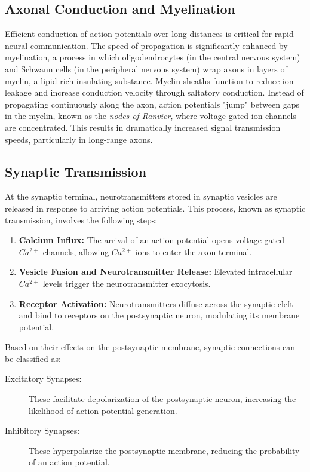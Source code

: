 \subsection{Axonal Conduction and Myelination}
\label{subsec:axonal_conduction}
Efficient conduction of action potentials over long distances is critical for
rapid neural communication. The speed of propagation is significantly enhanced by
myelination, a process in which oligodendrocytes (in the central nervous system) 
and Schwann cells (in the peripheral nervous system) wrap axons in layers of myelin, 
a lipid-rich insulating substance. Myelin sheaths function to reduce ion leakage and 
increase conduction velocity through saltatory conduction. Instead of propagating 
continuously along the axon, action potentials "jump" between gaps in the myelin, 
known as the \emph{nodes of Ranvier}, where voltage-gated ion channels are concentrated. 
This results in dramatically increased signal transmission speeds, particularly 
in long-range axons.

\subsection{Synaptic Transmission}
\label{subsec:synaptic_transmission}
At the synaptic terminal, neurotransmitters stored in synaptic vesicles are released 
in response to arriving action potentials. This process, known as synaptic transmission,
involves the following steps:

\begin{enumerate}
    \item \textbf{Calcium Influx:} The arrival of an action potential opens voltage-gated 
    $Ca^{2+}$ channels, allowing $Ca^{2+}$ ions to enter the axon terminal.
    \item \textbf{Vesicle Fusion and Neurotransmitter Release:} Elevated intracellular $Ca^{2+}$
    levels trigger the neurotransmitter exocytosis.
    \item \textbf{Receptor Activation:} Neurotransmitters diffuse across the synaptic cleft 
    and bind to receptors on the postsynaptic neuron, modulating its membrane potential. 
\end{enumerate}

Based on their effects on the postsynaptic membrane, synaptic connections can be classified as:
\begin{description}
    \item[Excitatory Synapses:] These facilitate depolarization of the postsynaptic neuron, 
    increasing the likelihood of action potential generation.
    \item[Inhibitory Synapses:] These hyperpolarize the postsynaptic membrane, reducing the 
    probability of an action potential.
\end{description}

